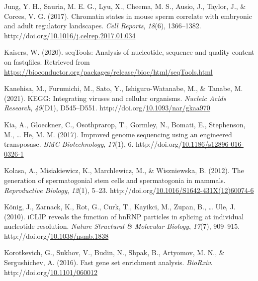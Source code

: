 \documentclass[12pt,twoside]{reedthesis}
\newlength{\cslhangindent}
\newenvironment{CSLReferences}[2] %
 {%
  \setlength{\parindent}{0pt}
  \ifodd #1 \everypar{\setlength{\hangindent}{\cslhangindent}}\ignorespaces\fi
  \ifnum #2 > 0
  \setlength{\parskip}{#2\baselineskip}
  \fi
 }%
 {}
\begin{document}
\begin{CSLReferences}{1}{0}
\leavevmode{}%
Jung, Y. H., Sauria, M. E. G., Lyu, X., Cheema, M. S., Ausio, J., Taylor, J., \& Corces, V. G. (2017). Chromatin states in mouse sperm correlate with embryonic and adult regulatory landscapes. \emph{Cell Reports}, \emph{18}(6), 1366--1382. http://doi.org/\href{https://doi.org/10.1016/j.celrep.2017.01.034}{10.1016/j.celrep.2017.01.034}

\leavevmode{}%
Kaisers, W. (2020). seqTools: Analysis of nucleotide, sequence and quality content on fastqfiles. Retrieved from \url{https://bioconductor.org/packages/release/bioc/html/seqTools.html}

\leavevmode{}%
Kanehisa, M., Furumichi, M., Sato, Y., Ishiguro-Watanabe, M., \& Tanabe, M. (2021). KEGG: Integrating viruses and cellular organisms. \emph{Nucleic Acids Research}, \emph{49}(D1), D545--D551. http://doi.org/\href{https://doi.org/10.1093/nar/gkaa970}{10.1093/nar/gkaa970}

\leavevmode{}%
Kia, A., Gloeckner, C., Osothprarop, T., Gormley, N., Bomati, E., Stephenson, M., \ldots{} He, M. M. (2017). Improved genome sequencing using an engineered transposase. \emph{BMC Biotechnology}, \emph{17}(1), 6. http://doi.org/\href{https://doi.org/10.1186/s12896-016-0326-1}{10.1186/s12896-016-0326-1}

\leavevmode{}%
Kolasa, A., Misiakiewicz, K., Marchlewicz, M., \& Wiszniewska, B. (2012). The generation of spermatogonial stem cells and spermatogonia in mammals. \emph{Reproductive Biology}, \emph{12}(1), 5--23. http://doi.org/\href{https://doi.org/10.1016/S1642-431X(12)60074-6}{10.1016/S1642-431X(12)60074-6}

\leavevmode{}%
König, J., Zarnack, K., Rot, G., Curk, T., Kayikci, M., Zupan, B., \ldots{} Ule, J. (2010). iCLIP reveals the function of hnRNP particles in splicing at individual nucleotide resolution. \emph{Nature Structural \& Molecular Biology}, \emph{17}(7), 909--915. http://doi.org/\href{https://doi.org/10.1038/nsmb.1838}{10.1038/nsmb.1838}

\leavevmode{}%
Korotkevich, G., Sukhov, V., Budin, N., Shpak, B., Artyomov, M. N., \& Sergushichev, A. (2016). Fast gene set enrichment analysis. \emph{BioRxiv}. http://doi.org/\href{https://doi.org/10.1101/060012}{10.1101/060012}


\end{CSLReferences}
\end{document}
